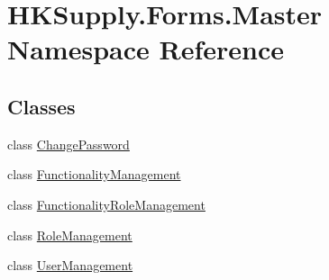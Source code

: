 \hypertarget{namespace_h_k_supply_1_1_forms_1_1_master}{}\section{H\+K\+Supply.\+Forms.\+Master Namespace Reference}
\label{namespace_h_k_supply_1_1_forms_1_1_master}
\subsection*{Classes}
\begin{DoxyCompactItemize}
\item 
class \hyperlink{class_h_k_supply_1_1_forms_1_1_master_1_1_change_password}{Change\+Password}
\item 
class \hyperlink{class_h_k_supply_1_1_forms_1_1_master_1_1_functionality_management}{Functionality\+Management}
\item 
class \hyperlink{class_h_k_supply_1_1_forms_1_1_master_1_1_functionality_role_management}{Functionality\+Role\+Management}
\item 
class \hyperlink{class_h_k_supply_1_1_forms_1_1_master_1_1_role_management}{Role\+Management}
\item 
class \hyperlink{class_h_k_supply_1_1_forms_1_1_master_1_1_user_management}{User\+Management}
\end{DoxyCompactItemize}
